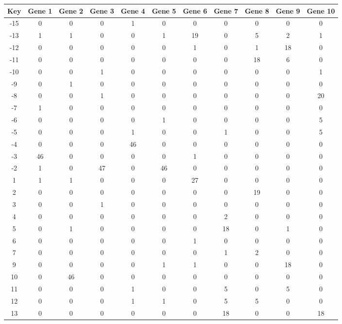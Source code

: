 \begin{tabular}{|c|c|c|c|c|c|c|c|c|c|c|}
\hline
Key & Gene 1 & Gene 2 & Gene 3 & Gene 4 & Gene 5 & Gene 6 & Gene 7 & Gene 8 & Gene 9 & Gene 10 \\
\hline
-15 & 0 & 0 & 0 & 1 & 0 & 0 & 0 & 0 & 0 & 0 \\
-13 & 1 & 1 & 0 & 0 & 1 & 19 & 0 & 5 & 2 & 1 \\
-12 & 0 & 0 & 0 & 0 & 0 & 1 & 0 & 1 & 18 & 0 \\
-11 & 0 & 0 & 0 & 0 & 0 & 0 & 0 & 18 & 6 & 0 \\
-10 & 0 & 0 & 1 & 0 & 0 & 0 & 0 & 0 & 0 & 1 \\
-9 & 0 & 1 & 0 & 0 & 0 & 0 & 0 & 0 & 0 & 0 \\
-8 & 0 & 0 & 1 & 0 & 0 & 0 & 0 & 0 & 0 & 20 \\
-7 & 1 & 0 & 0 & 0 & 0 & 0 & 0 & 0 & 0 & 0 \\
-6 & 0 & 0 & 0 & 0 & 1 & 0 & 0 & 0 & 0 & 5 \\
-5 & 0 & 0 & 0 & 1 & 0 & 0 & 1 & 0 & 0 & 5 \\
-4 & 0 & 0 & 0 & 46 & 0 & 0 & 0 & 0 & 0 & 0 \\
-3 & 46 & 0 & 0 & 0 & 0 & 1 & 0 & 0 & 0 & 0 \\
-2 & 1 & 0 & 47 & 0 & 46 & 0 & 0 & 0 & 0 & 0 \\
1 & 1 & 1 & 0 & 0 & 0 & 27 & 0 & 0 & 0 & 0 \\
2 & 0 & 0 & 0 & 0 & 0 & 0 & 0 & 19 & 0 & 0 \\
3 & 0 & 0 & 1 & 0 & 0 & 0 & 0 & 0 & 0 & 0 \\
4 & 0 & 0 & 0 & 0 & 0 & 0 & 2 & 0 & 0 & 0 \\
5 & 0 & 1 & 0 & 0 & 0 & 0 & 18 & 0 & 1 & 0 \\
6 & 0 & 0 & 0 & 0 & 0 & 1 & 0 & 0 & 0 & 0 \\
7 & 0 & 0 & 0 & 0 & 0 & 0 & 1 & 2 & 0 & 0 \\
9 & 0 & 0 & 0 & 0 & 1 & 1 & 0 & 0 & 18 & 0 \\
10 & 0 & 46 & 0 & 0 & 0 & 0 & 0 & 0 & 0 & 0 \\
11 & 0 & 0 & 0 & 1 & 0 & 0 & 5 & 0 & 5 & 0 \\
12 & 0 & 0 & 0 & 1 & 1 & 0 & 5 & 5 & 0 & 0 \\
13 & 0 & 0 & 0 & 0 & 0 & 0 & 18 & 0 & 0 & 18 \\
\hline
\end{tabular}
